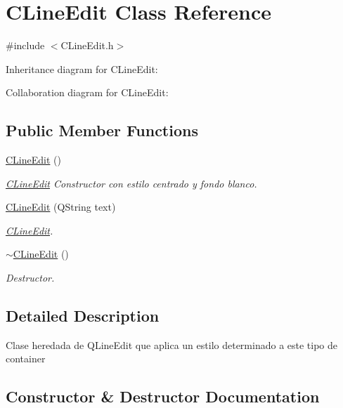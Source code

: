 \hypertarget{classCLineEdit}{}\section{C\+Line\+Edit Class Reference}
\label{classCLineEdit}


{\ttfamily \#include $<$C\+Line\+Edit.\+h$>$}



Inheritance diagram for C\+Line\+Edit\+:


Collaboration diagram for C\+Line\+Edit\+:
\subsection*{Public Member Functions}
\begin{DoxyCompactItemize}
\item 
\hyperlink{classCLineEdit_afb3493949a61a9d51eea5182bfc0a591}{C\+Line\+Edit} ()
\begin{DoxyCompactList}\small\item\em \hyperlink{classCLineEdit}{C\+Line\+Edit} Constructor con estilo centrado y fondo blanco. \end{DoxyCompactList}\item 
\hyperlink{classCLineEdit_a67d172f77a4cd9233aee3684248436f5}{C\+Line\+Edit} (Q\+String text)
\begin{DoxyCompactList}\small\item\em \hyperlink{classCLineEdit}{C\+Line\+Edit}. \end{DoxyCompactList}\item 
\hyperlink{classCLineEdit_a4d03efd8b636f5f9a584200e222ca6cc}{$\sim$\+C\+Line\+Edit} ()
\begin{DoxyCompactList}\small\item\em Destructor. \end{DoxyCompactList}\end{DoxyCompactItemize}


\subsection{Detailed Description}
Clase heredada de \textquotesingle{}Q\+Line\+Edit\textquotesingle{} que aplica un estilo determinado a este tipo de container 

\subsection{Constructor \& Destructor Documentation}
